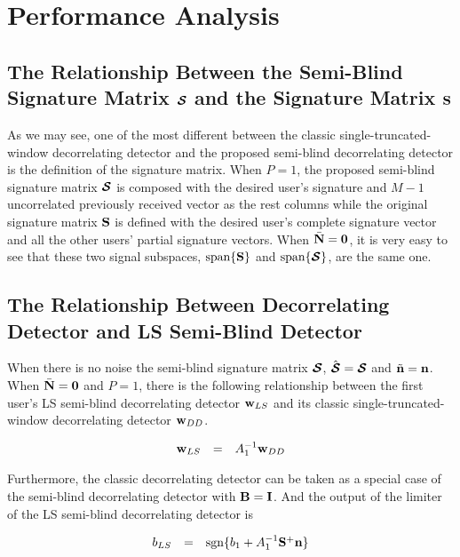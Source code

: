 \documentclass[a4paper,10pt,fleqn, twocolumn]{IEEETran}
\newcommand{\bn}{{\bf n}}
\newcommand{\bw}{{\bf w}}
\newcommand{\bN}{{\bf N}}
\newcommand{\bS}{{\bf S}}
\newcommand{\bI}{{\bf I}}
\newcommand{\bB}{{\bf B}}
\newcommand{\bcS}{{\mbox {\boldmath ${\cal S}$}}}
\begin{document}
\section{Performance Analysis}

\subsection{The Relationship Between the Semi-Blind Signature Matrix $\bcS$ and the Signature Matrix $\bS$}

As we may see, one of the most different between the classic
single-truncated-window decorrelating detector and the proposed
semi-blind decorrelating detector is the definition of the
signature matrix. When $P=1$, the proposed semi-blind signature
matrix $\bcS$ is composed with the desired user's signature and
$M-1$ uncorrelated previously received vector as the rest columns
while the original signature matrix $\bS$ is defined with the
desired user's complete signature vector and all the other users'
partial signature vectors. When $\bar{\bN} = \mathbf{0}$, it is
very easy to see that these two signal subspaces,
$\mbox{span}\{\bS\}$ and $\mbox{span}\{\bcS\}$, are the same one.

\subsection{The Relationship Between Decorrelating Detector and LS Semi-Blind Detector }

When there is no noise the semi-blind signature matrix $\bcS$,
$\hat{\bcS}=\bcS$ and $\tilde{\bn}=\bn$. When
$\bar{\bN}=\mathbf{0}$ and $P=1$, there is the following
relationship between the first user's LS semi-blind decorrelating
detector $\bw_{LS}$ and its classic single-truncated-window
decorrelating detector $\bw_{DD}$.

\begin{equation}
\begin{array}{rcl}
\bw_{LS}&=&A_1^{-1}\bw_{DD}
\end{array}
\end{equation} \label{wN0}

\noindent Furthermore, the classic decorrelating detector can be
taken as a special case of the semi-blind decorrelating detector
with $\bB =\bI$. And the output of the limiter of the LS
semi-blind decorrelating detector is

\begin{equation}
\begin{array}{rcl}
b_{LS}&=&\mbox{sgn}\{b_1+A_1^{-1}\bS^+\bn\}
\end{array} \label{b_LS_N0}
\end{equation}
\end{document}

